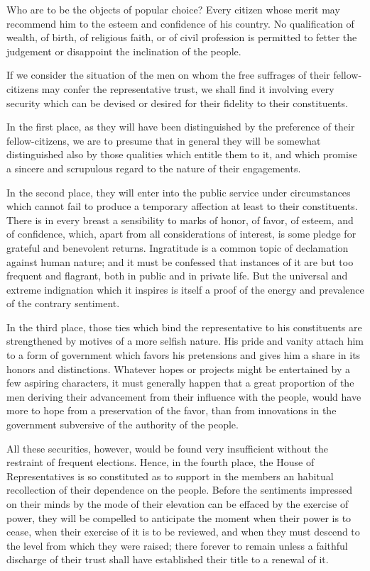 Who are to be the objects of popular choice? Every citizen whose merit may recommend him to the esteem and confidence of his country. No qualification of wealth, of birth, of religious faith, or of civil profession is permitted to fetter the judgement or disappoint the inclination of the people.

If we consider the situation of the men on whom the free suffrages of their fellow-citizens may confer the representative trust, we shall find it involving every security which can be devised or desired for their fidelity to their constituents.

In the first place, as they will have been distinguished by the preference of their fellow-citizens, we are to presume that in general they will be somewhat distinguished also by those qualities which entitle them to it, and which promise a sincere and scrupulous regard to the nature of their engagements.

In the second place, they will enter into the public service under circumstances which cannot fail to produce a temporary affection at least to their constituents. There is in every breast a sensibility to marks of honor, of favor, of esteem, and of confidence, which, apart from all considerations of interest, is some pledge for grateful and benevolent returns. Ingratitude is a common topic of declamation against human nature; and it must be confessed that instances of it are but too frequent and flagrant, both in public and in private life. But the universal and extreme indignation which it inspires is itself a proof of the energy and prevalence of the contrary sentiment.

In the third place, those ties which bind the representative to his constituents are strengthened by motives of a more selfish nature. His pride and vanity attach him to a form of government which favors his pretensions and gives him a share in its honors and distinctions. Whatever hopes or projects might be entertained by a few aspiring characters, it must generally happen that a great proportion of the men deriving their advancement from their influence with the people, would have more to hope from a preservation of the favor, than from innovations in the government subversive of the authority of the people.

All these securities, however, would be found very insufficient without the restraint of frequent elections. Hence, in the fourth place, the House of Representatives is so constituted as to support in the members an habitual recollection of their dependence on the people. Before the sentiments impressed on their minds by the mode of their elevation can be effaced by the exercise of power, they will be compelled to anticipate the moment when their power is to cease, when their exercise of it is to be reviewed, and when they must descend to the level from which they were raised; there forever to remain unless a faithful discharge of their trust shall have established their title to a renewal of it.

